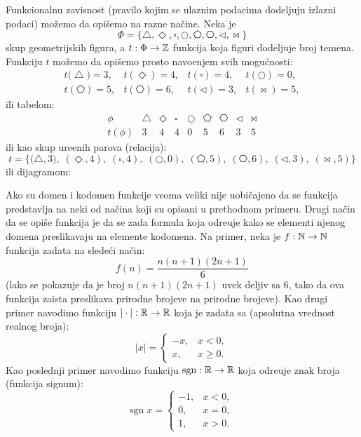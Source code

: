 \begin{EX}
  Funkcionalnu zavisnost (pravilo kojim se ulaznim podacima dodeljuju izlazni podaci)
  mo\v zemo da opi\v semo na razne na\v cine. Neka je
  $$
    \Phi = \big\{\bigtriangleup, \Diamond, \square, \bigcirc, \pentagon, \hexagon, \triangleleft, \bowtie\big\}
  $$
  skup geometrijskih figura, a $t : \Phi \to \mathbb{Z}$ funkcija koja figuri dodeljuje broj temena.
  Funkciju $t$ mo\v zemo da opi\v semo prosto navo\dj enjem svih mogu\'cnosti:
  $$
    \begin{array}{llll}
      t\big(\bigtriangleup\big) = 3, & t(\Diamond) = 4, & t(\square) = 4, & t(\bigcirc) = 0,\\
      t(\pentagon) = 5, & t(\hexagon) = 6, & t(\triangleleft) = 3, & t(\bowtie) = 5,
    \end{array}
  $$
  ili tabelom:
  $$
    \begin{array}{c|cccccccc}
      \phi    & \bigtriangleup & \Diamond & \square & \bigcirc & \pentagon & \hexagon & \triangleleft & \bowtie\\
      \hline
      t(\phi) &  3             & 4        & 4       & 0        & 5         & 6        & 3             & 5
    \end{array}
  $$
  ili kao skup ure\dj enih parova (relacija):
  $$
    t = \big\{\big(\bigtriangleup, 3\big),\; (\Diamond, 4),\; (\square, 4),\; (\bigcirc, 0),\; (\pentagon, 5),\;
                  (\hexagon, 6),\; (\triangleleft, 3),\; (\bowtie, 5) \big\}
  $$
  ili dijagramom:
  \begin{center}
    
  \end{center}
\end{EX}

\begin{EX}
  Ako su domen i kodomen funkcije veoma veliki nije uobi\v cajeno da se funkcija predstavlja na neki od na\v cina koji
  su opisani u prethodnom primeru. Drugi na\v cin da se opi\v se
  funkcija je da se zada formula koja odre\dj uje kako se elementi njenog domena preslikavaju na elemente kodomena.
  Na primer, neka je $f : \mathbb{N} \to \mathbb{N}$ funkcija zadata na slede\'ci na\v cin:
  $$
    f(n) = \frac{n(n + 1)(2n + 1)}{6}
  $$
  (lako se pokazuje da je broj $n(n + 1)(2n + 1)$ uvek deljiv sa 6, tako da ova funkcija zaista preslikava prirodne brojeve
  na prirodne brojeve). Kao drugi primer navodimo funkciju $| \cdot | : \mathbb{R} \to \mathbb{R}$ koja je zadata sa
  (apsolutna vrednost realnog broja):
  $$
    |x| = \begin{cases}
      -x, & x < 0,\\
      x,  & x \ge 0.
    \end{cases}
  $$
  Kao poslednji primer navodimo funkciju $\mathrm{sgn} : \mathbb{R} \to \mathbb{R}$ koja odre\dj uje znak broja (funkcija signum):
  $$
    \mathrm{sgn} \; x = \begin{cases}
      -1, & x < 0,\\
       0, & x = 0,\\
       1, & x > 0.
    \end{cases}
  $$
\end{EX}

